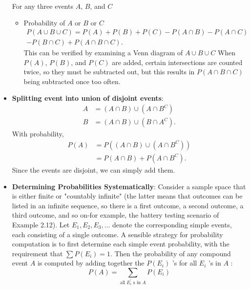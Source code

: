 \documentclass{report}
\begin{document}
\begin{itemize}
\begin{itemize}
            \end{itemize}
            For any three events $A$, $B$, and $C$
            \begin{itemize}
                \item Probability of $A$ or $B$ or $C$
                    \begin{align*}
                        P(A \cup B \cup C) = P(A) + P(B) + P(C) - P(A \cap B) - P(A \cap C)  \\
                        - P(B\cap C) + P(A \cap B \cap C)
                    .\end{align*}
                    This can be verified by examining a Venn diagram of $A \cup B \cup C $
                    When \( P(A) \), \( P(B) \), and \( P(C) \) are added, certain intersections are counted twice, so they must be subtracted out, but this results in \( P(A \cap B \cap C) \) being subtracted once too often.
            \end{itemize}
        \item \textbf{Splitting event into union of disjoint events}:
            \begin{align*}
                A &= (A \cap B) \cup (A \cap B^{C}) \\
                B &= (A \cap B) \cup (B \cap A^{C})
            .\end{align*}
            With probability,
            \begin{align*}
                P(A) &= P((A\cap B) \cup (A\cap B^{C})) \\
                &=P(A\cap B) + P(A \cap B^{C})
            .\end{align*}
            Since the events are disjoint, we can simply add them.
        \item \textbf{Determining Probabilities Systematically}:
            Consider a sample space that is either finite or "countably infinite" (the latter means that outcomes can be listed in an infinite sequence, so there is a first outcome, a second outcome, a third outcome, and so on-for example, the battery testing scenario of Example 2.12). Let $E_1, E_2, E_3, \ldots$ denote the corresponding simple events, each consisting of a single outcome. A sensible strategy for probability computation is to first determine each simple event probability, with the requirement that $\sum P\left(E_i\right)=1$. Then the probability of any compound event $A$ is computed by adding together the $P\left(E_i\right)$ 's for all $E_i$ 's in $A$ :
            $$
            P(A)=\sum_{\text {all } E_i^{\prime} \text { s in } A} P\left(E_i\right)
$$
\end{itemize}
\end{document}
